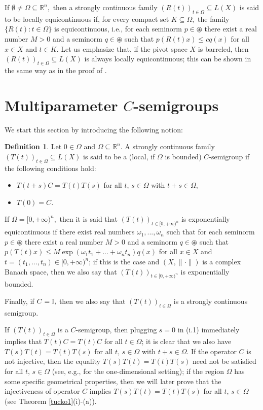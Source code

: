 \documentclass{amsart}
\theoremstyle{definition}
\newtheorem{defn}[thm]{Definition}
\theoremstyle{remark}
\numberwithin{equation}{section}
\begin{document}
If $\emptyset \neq \Omega \subseteq {\mathbb R}^{n},$ then
a strongly continuous family $(R(t))_{t\in \Omega}\subseteq L(X)$ is said to be locally equicontinuous if, for every compact set $K\subseteq \Omega,$
the family $\{ R(t) : t\in \Omega \}$ is equicontinuous, i.e., for each seminorm $p\in \circledast$ there exist a real number $M>0$ and a seminorm $q\in \circledast$ such that $p(R(t)x)\leq cq(x)$ for all $x\in X$ and $t\in K.$ Let us emphasize that, if the pivot space $X$ is barreled, then $(R(t))_{t\in \Omega}\subseteq L(X)$ is always locally equicontinuous; this can be shown in the same way as in the proof of \cite[Proposition 1.1]{komura}. 

\section{Multiparameter $C$-semigroups}\label{sec1}

We start this section by introducing the following notion: 

\begin{defn}\label{1.2.1.1}
Let $0\in \Omega$ and $\Omega  \subseteq {\mathbb R}^{n}.$ A strongly continuous family $(T(t))_{t\in \Omega}\subseteq L(X)$ 
is said to be a (local, if $\Omega$ is bounded) $C$-semigroup if the following conditions hold:
\begin{itemize}
\item[(i)] $T(t+s)C=T(t)T(s)$ for all $t$, $s\in \Omega$ with $t+s \in \Omega$,
\item[(ii)] $T(0)=C$.
\end{itemize}

If $\Omega=[0,+\infty)^{n},$ then it is said that $(T(t))_{t\in [0,+\infty)^{n}}$ is exponentially equicontinuous if there exist real numbers $\omega_{1},...,\omega_{n}$ such that for each seminorm $p\in \circledast$ there exist a real number $M>0$ and a seminorm $q\in \circledast$ such that $p(T(t)x)\leq M\exp(\omega_{1}t_{1}+...+\omega_{n}t_{n})q(x)$ for all $x\in X$ and $t=(t_{1},...,t_{n})\in [0,+\infty)^{n} $; if this is the case and $(X,\| \cdot \|)$ is a complex Banach space, then we also say that  $(T(t))_{t\in [0,+\infty)^{n}}$ is exponentially bounded.

Finally, if $C={\rm I}, $ then we also say that $(T(t))_{t\in \Omega}$ is a strongly continuous semigroup.
\end{defn}

If $(T(t))_{t\in \Omega} $ 
is a $C$-semigroup, then plugging $s=0$ in (i.1) immediately implies that $T(t)C=T(t)C$ for all $t\in \Omega$; it is clear that we also have $T(s)T(t)=T(t)T(s)$ for all $t$, $s\in \Omega$ with $t+s \in \Omega$. If the operator $C$ is not injective, then 
the equality $T(s)T(t)=T(t)T(s)$ need not be satisfied for all $t$, $s\in \Omega$ (see, e.g., \cite[p. 1098]{lishaw2007} for the one-dimensional setting); if the region $\Omega$ has some specific geometrical properties, then we will later prove that the injectiveness of operator $C$ implies $T(s)T(t)=T(t)T(s)$ for all $t$, $s\in \Omega $ (see Theorem \ref{tucko1}(i)-(a)).
\end{document}
